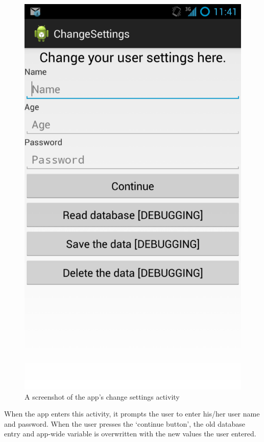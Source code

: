 \begin{figure}
 \centering 
 \includegraphics[clip = true, trim = 0 320 0 60,
 scale=0.2]{change_settings}
 \caption{A screenshot of the app's change settings activity}
 \label{fig:change-settings-screenshot}
\end{figure}

When the app enters this activity, it prompts the user to enter his/her user
name and password. When the user presses the `continue button', the old database
entry and app-wide variable is overwritten with the new values the user entered.

